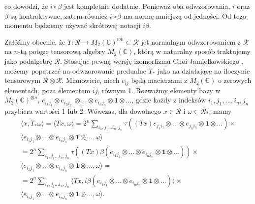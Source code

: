 co dowodzi, że $i \circ \beta$ jest kompletnie dodatnie.
Ponieważ oba odwzorowania, $i$ oraz $\beta$ są kontraktywne,
zatem również $i\circ\beta$ ma normę mniejszą od jedności.
Od tego momentu będziemy używać skrótowej notacji $i\beta$.

Załóżmy obecnie, że
$T: \mathcal{R} \rightarrow M_{2}(\mathbb{C})^{\otimes n}\subset \mathcal{R}$
jet normalnym odwzorowaniem z $\mathcal{R}$ na $n$-tą potęgę tensorową algebry
$M_{2}(\mathbb{C})$, którą w naturalny sposób traktujemy jako podalgebrę $\mathcal{R}$.
Stosując pewną wersję izomorfizmu Choi-Jamiolkowskiego
\cite{choi1975completely,jamiolkowski1974effective},
możemy popatrzeć na odwzorowanie predualne $T_{*}$ jako na działające na
iloczynie tensorowym $\mathcal{R}\otimes\mathcal{R}$.
Mianowicie, niech $e_{ij}$ będą macierzami z $M_{2}(\mathbb{C})$
o zerowych elementach, poza elementem $ij$, równym 1.
Rozważmy elementy bazy w
$M_{2}(\mathbb{C})^{\otimes n}$,
$e_{i_{1} j_{1}} \otimes e_{i_{2} j_{2}} \
\otimes \ldots \otimes e_{i_{n} j_{n}} \otimes \mathbf{1} \otimes \ldots$,
gdzie każdy z indeksów $i_{1}, j_{1}, \ldots, i_{n}, j_{n}$
przybiera wartości 1 lub 2.
Wówczas, dla dowolnego $x \in \mathcal{R}$ i
$\omega \in \mathcal{R}_{*}$, mamy
\begin{eqnarray}
\langle x, T_{*} \omega \rangle =\langle T x,  \omega \rangle
=  2^{n} \sum \limits_{i_{1}, j_{1}\ldots i_{n}, j_{n}}
\tau \left((Tx) e_{j_{1} i_{1}} \otimes \ldots \otimes e_{j_{n} i_{n}}
\otimes \mathbf{1} \otimes \ldots \right) \times \nonumber\\
\langle e_{i_{1} j_{1}} \otimes \ldots \otimes e_{i_{n} j_{n}}
\otimes \mathbf{1} \otimes \ldots ,\omega \rangle\nonumber\\
= 2^{n} \sum \limits_{i_{1}, j_{1}\ldots i_{n}, j_{n}} \tau \left((Tx)
\beta (e_{i_{1} j_{1}} \otimes \ldots \otimes e_{i_{n} j_{n}}
\otimes \mathbf{1} \otimes \ldots ) \right) \times \nonumber\\
\langle e_{i_{1} j_{1}} \otimes \ldots \otimes e_{i_{n}j_{n}}
\otimes \mathbf{1} \otimes \ldots  , \omega \rangle = \nonumber\\
=  2^{n} \sum \limits_{i_{1}, j_{1}\ldots i_{n}, j_{n}}
\langle Tx ,i \beta (e_{i_{1} j_{1}} \otimes \ldots \otimes e_{i_{n} j_{n}}
\otimes \mathbf{1} \otimes \ldots) \rangle\times\nonumber\\
\langle e_{i_{1} j_{1}} \otimes \ldots \otimes e_{i_{n} j_{n}}
\otimes \mathbf{1} \otimes \ldots,\omega \rangle .
\end{eqnarray}

